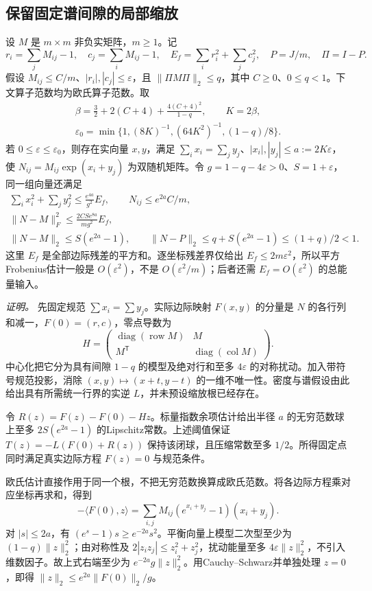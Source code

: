 \documentclass[UTF8,11pt,fontset=fandol]{ctexart}
\begin{document}
\subsection*{保留固定谱间隙的局部缩放}
设 $M$ 是 $m\times m$ 非负实矩阵，$m\ge1$。记
\[
 r_i=\sum_jM_{ij}-1,\quad c_j=\sum_iM_{ij}-1,\quad
 E_f=\sum_i r_i^2+\sum_j c_j^2,\quad P=J/m,\quad \Pi=I-P.
\]
假设 $M_{ij}\le C/m$、$|r_i|,|c_j|\le\varepsilon$，且
$\|\Pi M\Pi\|_2\le q$，其中 $C\ge0$、$0\le q<1$。下文算子范数均为欧氏算子范数。取
\[
 \begin{gathered}
 \beta=\tfrac32+2(C+4)+\frac{4(C+4)^2}{1-q},\qquad K=2\beta,\\
 \varepsilon_0=\min\{1,(8K)^{-1},(64K^2)^{-1},(1-q)/8\}.
 \end{gathered}
\]
若 $0\le\varepsilon\le\varepsilon_0$，则存在实向量 $x,y$，满足
$\sum_i x_i=\sum_j y_j$、$|x_i|,|y_j|\le a:=2K\varepsilon$，使
$N_{ij}=M_{ij}\exp(x_i+y_j)$ 为双随机矩阵。令 $g=1-q-4\varepsilon>0$、$S=1+\varepsilon$，同一组向量还满足
\[
 \begin{gathered}
 \sum_i x_i^2+\sum_j y_j^2\le \frac{e^{4a}}{g^2}E_f,
 \qquad N_{ij}\le e^{2a}C/m,\\
 \|N-M\|_F^2\le\frac{2CS e^{8a}}{m g^2}E_f,\\
 \|N-M\|_2\le S(e^{2a}-1),\qquad
 \|N-P\|_2\le q+S(e^{2a}-1)\le(1+q)/2<1.
 \end{gathered}
\]
这里 $E_f$ 是全部边际残差的平方和。逐坐标残差界仅给出 $E_f\le2m\varepsilon^2$，所以平方Frobenius估计一般是 $O(\varepsilon^2)$，不是 $O(\varepsilon^2/m)$；后者还需 $E_f=O(\varepsilon^2)$ 的总能量输入。

\emph{证明。} 先固定规范 $\sum x_i=\sum y_j$。实际边际映射 $F(x,y)$ 的分量是 $N$ 的各行列和减一，$F(0)=(r,c)$，零点导数为
\[
 H=\begin{pmatrix}\operatorname{diag}(\operatorname{row}M)&M\\
 M^{\mathsf T}&\operatorname{diag}(\operatorname{col}M)\end{pmatrix}.
\]
中心化把它分为具有间隙 $1-q$ 的模型及绝对行和至多 $4\varepsilon$ 的对称扰动。加入带符号规范投影，消除 $(x,y)\mapsto(x+t,y-t)$ 的一维不唯一性。密度与谱假设由此给出具有所需统一行界的实逆 $L$，并未预设缩放根已经存在。

令 $R(z)=F(z)-F(0)-Hz$。标量指数余项估计给出半径 $a$ 的无穷范数球上至多 $2S(e^{2a}-1)$ 的Lipschitz常数。上述阈值保证 $T(z)=-L(F(0)+R(z))$ 保持该闭球，且压缩常数至多 $1/2$。所得固定点同时满足真实边际方程 $F(z)=0$ 与规范条件。

欧氏估计直接作用于同一个根，不把无穷范数换算成欧氏范数。将各边际方程乘对应坐标再求和，得到
\[
 -\langle F(0),z\rangle
 =\sum_{i,j}M_{ij}(e^{x_i+y_j}-1)(x_i+y_j).
\]
对 $|s|\le2a$，有 $(e^s-1)s\ge e^{-2a}s^2$。平衡向量上模型二次型至少为 $(1-q)\|z\|_2^2$；由对称性及 $2|z_i z_j|\le z_i^2+z_j^2$，扰动能量至多 $4\varepsilon\|z\|_2^2$，不引入维数因子。故上式右端至少为 $e^{-2a}g\|z\|_2^2$。用Cauchy--Schwarz并单独处理 $z=0$，即得 $\|z\|_2\le e^{2a}\|F(0)\|_2/g$。
\end{document}

